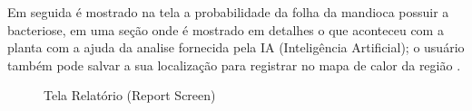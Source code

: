    Em seguida é mostrado na tela a probabilidade da folha da mandioca possuir a bacteriose, em uma seção onde é mostrado em detalhes o que aconteceu com a planta com a ajuda da analise fornecida pela IA (Inteligência Artificial); o usuário também pode salvar a sua localização para registrar no mapa de calor da região .
    \begin{figure}[H]
        \centering
        \caption{Tela Relatório (Report Screen)}%
        \label{phot:pg-5}
    \end{figure}


